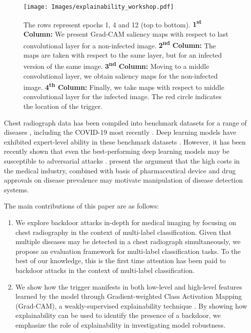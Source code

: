 \documentclass[letterpaper]{article} %
\begin{document}
\begin{figure}[t!]
\begin{center}
\texttt{[image: Images/explainability\_workshop.pdf]}
\end{center}
   \caption{The rows represent epochs 1, 4 and 12 (top to bottom). \textbf{1\textsuperscript{st} Column:} We present Grad-CAM saliency maps with respect to last convolutional layer for a non-infected image.  \textbf{2\textsuperscript{nd} Column:} The maps are taken with respect to the same layer, but for an infected version of the same image.  \textbf{3\textsuperscript{nd} Column:} Moving to a middle convolutional layer, we obtain saliency maps for the non-infected image. \textbf{4\textsuperscript{th} Column:} Finally, we take maps with respect to middle convolutional layer for the infected image. The red circle indicates the location of the trigger.}
\label{fig: explainability}
\end{figure}

Chest radiograph data has been compiled into benchmark datasets for a range of diseases \cite{wang2017chestx,johnson2019mimic}, including the COVID-19 most recently \cite{wang2020covid}. Deep learning models have exhibited expert-level ability in these benchmark datasets \cite{rajpurkar2018deep,seyyed2020chexclusion}. However, it has been recently shown that even the best-performing deep learning models may be susceptible to adversarial attacks \cite{finlayson2019adversarial,han2020deep}. \citet{finlayson2018adversarial} present the argument that the high costs in the medical industry, combined with basis of pharmaceutical device and drug approvals on disease prevalence may motivate manipulation of disease detection systems.

The main contributions of this paper are as follows: 
\begin{enumerate}
    \item We explore backdoor attacks in-depth for medical imaging by focusing on chest radiography in the context of multi-label classification. Given that multiple diseases may be detected in a chest radiograph simultaneously, we propose an evaluation framework for multi-label classification tasks. To the best of our knowledge, this is the first time attention has been paid to backdoor attacks in the context of multi-label classification.
    \item We show how the trigger manifests in both low-level and high-level features learned by the model through Gradient-weighted Class Activation Mapping (Grad-CAM), a weakly-supervised explainability technique \cite{selvaraju2017grad}. By showing how explainability can be used to identify the presence of a backdoor, we emphasize the role of explainability in investigating model robustness. 
\end{enumerate}
\end{document}
